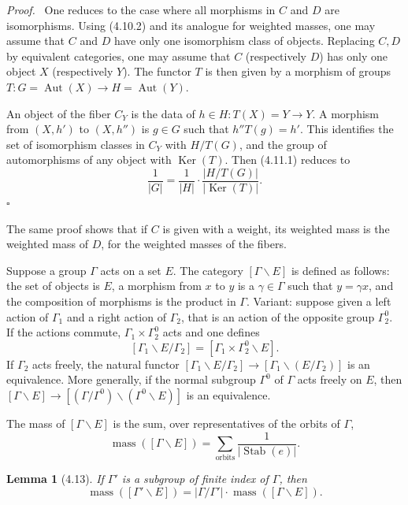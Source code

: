 \documentclass[10pt]{article}
\newcommand{\Aut}{\operatorname{Aut}}
\newcommand{\mass}{\operatorname{mass}}
\theoremstyle{deligne}
\newtheorem*{lemma*}{Lemma}
\newenvironment{proofdel}[1][Proof.]{\textit{#1}\ }{\hfill$\square$}
\newcommand{\Stab}{\operatorname{Stab}}
\newcommand{\Ker}{\operatorname{Ker}}
\newcommand{\heading}[1]{\vspace{0.7em}\noindent{\bfseries #1}\quad}
\begin{document}
\begin{proofdel}
One reduces to the case where all morphisms in $C$ and $D$ are isomorphisms. Using (4.10.2) and its analogue for weighted masses, one may assume that $C$ and $D$ have only one isomorphism class of objects. Replacing $C,D$ by equivalent categories, one may assume that $C$ (respectively $D$) has only one object $X$ (respectively $Y$). The functor $T$ is then given by a morphism of groups $T:G=\Aut(X)\to H=\Aut(Y)$.

An object of the fiber $C_Y$ is the data of $h\in H:T(X)=Y\to Y$. A morphism from $(X,h')$ to $(X,h'')$ is $g\in G$ such that $h''T(g)=h'$. This identifies the set of isomorphism classes in $C_Y$ with $H/T(G)$, and the group of automorphisms of any object with $\Ker(T)$. Then (4.11.1) reduces to
\[
\frac1{|G|}=\frac1{|H|}\cdot \frac{|H/T(G)|}{|\Ker(T)|}.
\]
\end{proofdel}

The same proof shows that if $C$ is given with a weight, its weighted mass is the weighted mass of $D$, for the weighted masses of the fibers.

\heading{4.12.} Suppose a group $\Gamma$ acts on a set $E$. The category $[\Gamma\backslash E]$ is defined as follows: the set of objects is $E$, a morphism from $x$ to $y$ is a $\gamma\in\Gamma$ such that $y=\gamma x$, and the composition of morphisms is the product in $\Gamma$. Variant: suppose given a left action of $\Gamma_1$ and a right action of $\Gamma_2$, that is an action of the opposite group $\Gamma_2^0$. If the actions commute, $\Gamma_1\times\Gamma_2^0$ acts and one defines
\[
[\Gamma_1\backslash E/\Gamma_2]=[\Gamma_1\times\Gamma_2^0\backslash E].
\]
If $\Gamma_2$ acts freely, the natural functor $[\Gamma_1\backslash E/\Gamma_2]\to[\Gamma_1\backslash(E/\Gamma_2)]$ is an equivalence. More generally, if the normal subgroup $\Gamma^0$ of $\Gamma$ acts freely on $E$, then $[\Gamma\backslash E]\to[(\Gamma/\Gamma^0)\backslash(\Gamma^0\backslash E)]$ is an equivalence.

The mass of $[\Gamma\backslash E]$ is the sum, over representatives of the orbits of $\Gamma$,
\begin{equation}\tag{4.12.1}
\mass([\Gamma\backslash E])=\sum_{\mathrm{orbits}}\frac1{|\Stab(e)|}.
\end{equation}

\begin{lemma*}[4.13]
If $\Gamma'$ is a subgroup of finite index of $\Gamma$, then
\begin{equation}\tag{4.13.1}
\mass([\Gamma'\backslash E])=|\Gamma/\Gamma'|\cdot\mass([\Gamma\backslash E]).
\end{equation}
\end{lemma*}
\end{document}
